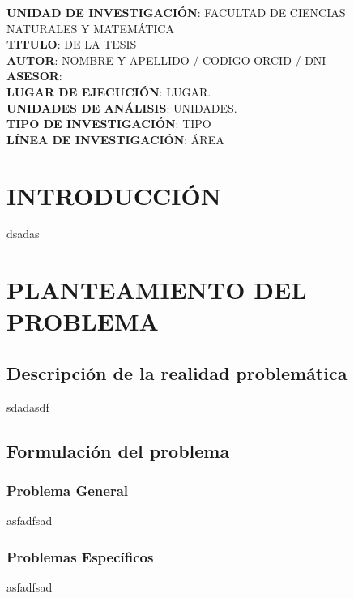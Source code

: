 \documentclass[12pt,a4paper]{article}
\begin{document}
\textbf{UNIDAD DE INVESTIGACIÓN}: FACULTAD DE CIENCIAS NATURALES Y MATEMÁTICA\\[0.4cm]

\textbf{TITULO}: DE LA TESIS\\[0.4cm]

\textbf{AUTOR}: NOMBRE Y APELLIDO / CODIGO ORCID / DNI\\[0.4cm]

\textbf{ASESOR}:\\[0.4cm]

\textbf{LUGAR DE EJECUCIÓN}: LUGAR.\\[0.4cm]

\textbf{UNIDADES DE ANÁLISIS}: UNIDADES.\\[0.4cm]

\textbf{TIPO DE INVESTIGACIÓN}: TIPO\\[0.4cm]

\textbf{LÍNEA DE INVESTIGACIÓN}: ÁREA\\[0.4cm]

\newpage
\setcounter{page}{1}
\pagestyle{fancy}
\tableofcontents

\newpage

\section*{INTRODUCCIÓN}
dsadas

\newpage
\section{PLANTEAMIENTO DEL PROBLEMA}
\subsection{Descripción de la realidad problemática}
sdadasdf

\newpage

\subsection{Formulación del problema}
\subsubsection{Problema General}
asfadfsad
\subsubsection{Problemas Específicos}
asfadfsad
\end{document}
